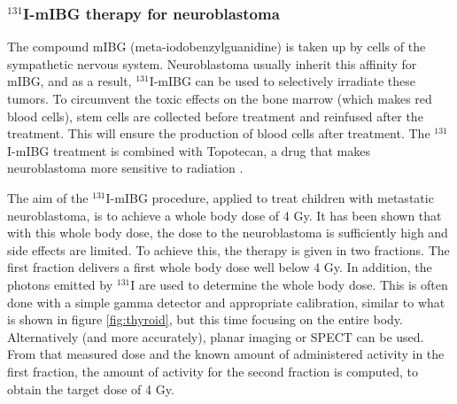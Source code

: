 \documentclass[11pt,oneside]{article}
\begin{document}
\subsubsection{$^{131}$I-mIBG therapy for neuroblastoma}
The compound mIBG (meta-iodobenzylguanidine) is taken up by cells of
the sympathetic nervous system. Neuroblastoma usually inherit this
affinity for mIBG, and as a result, $^{131}$I-mIBG can be used to
selectively irradiate these tumors. To circumvent the toxic effects on
the bone marrow (which makes red blood cells), stem cells are
collected before treatment and reinfused after the treatment. This
will ensure the production of blood cells after treatment. The
$^{131}$I-mIBG treatment is combined with Topotecan, a drug that makes
neuroblastoma more sensitive to radiation \cite{Gaze2015}.

The aim of the $^{131}$I-mIBG procedure, applied to treat children
with metastatic neuroblastoma, is to achieve a whole body dose of 4
Gy. It has been shown that with this whole body dose, the dose to the
neuroblastoma is sufficiently high and side effects are limited. To
achieve this, the therapy is given in two fractions. The first
fraction delivers a first whole body dose well below 4 Gy. In
addition, the photons emitted by $^{131}$I are used to determine the
whole body dose. This is often done with a simple gamma detector and
appropriate calibration, similar to what is shown in figure
\ref{fig:thyroid}, but this time focusing on the entire
body. Alternatively (and more accurately), planar imaging or SPECT can
be used. From that measured dose and the known amount of administered
activity in the first fraction, the amount of activity for the second
fraction is computed, to obtain the target dose of 4 Gy.
\end{document}

